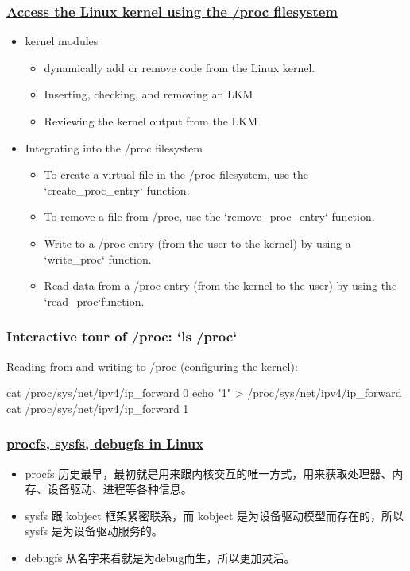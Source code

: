 \begin{frame}[fragile]
    \frametitle{\href{https://developer.ibm.com/technologies/linux/articles/l-proc/}{Access the Linux kernel using the /proc filesystem}}


    \begin{itemize}
        \item kernel modules
	    \begin{itemize}
	        \item dynamically add or remove code from the Linux kernel.
          \item Inserting, checking, and removing an LKM
          \item Reviewing the kernel output from the LKM
      \end{itemize} \pause
        \item Integrating into the /proc filesystem
	    \begin{itemize}
	        \item To create a virtual file in the /proc filesystem, use the `create\_proc\_entry` function.
          \item To remove a file from /proc, use the `remove\_proc\_entry` function.
          \item Write to a /proc entry (from the user to the kernel) by using a `write\_proc` function.
          \item Read data from a /proc entry (from the kernel to the user) by using the `read\_proc`function.
      \end{itemize}
    \end{itemize}
% 
\end{frame}
\begin{frame}[fragile]
    \frametitle{Interactive tour of /proc: `ls /proc`}

% 
Reading from and writing to /proc (configuring the kernel): 
% 
\begin{semiverbatim}
cat /proc/sys/net/ipv4/ip\_forward
0
echo "1" > /proc/sys/net/ipv4/ip\_forward
cat /proc/sys/net/ipv4/ip\_forward
1
\end{semiverbatim}
% 
\end{frame}
\begin{frame}[fragile]
    \frametitle{\href{https://www.cnblogs.com/qiuheng/p/5761877.html}{procfs, sysfs, debugfs in Linux}}


    \begin{itemize}
        \item procfs 历史最早，最初就是用来跟内核交互的唯一方式，用来获取处理器、内存、设备驱动、进程等各种信息。
        \item sysfs 跟 kobject 框架紧密联系，而 kobject 是为设备驱动模型而存在的，所以 sysfs 是为设备驱动服务的。
        \item debugfs 从名字来看就是为debug而生，所以更加灵活。
    \end{itemize}
% 
\end{frame}

